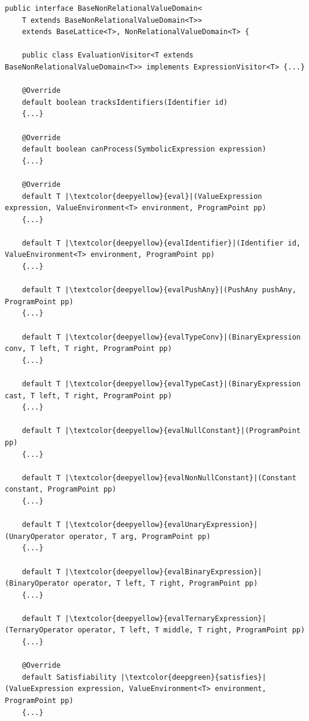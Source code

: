 
\begin{lstlisting}[belowskip=-1.1 \baselineskip, escapechar=|]
public interface BaseNonRelationalValueDomain<
    T extends BaseNonRelationalValueDomain<T>>
    extends BaseLattice<T>, NonRelationalValueDomain<T> {
    
    public class EvaluationVisitor<T extends BaseNonRelationalValueDomain<T>> implements ExpressionVisitor<T> {...}
    
    @Override
    default boolean tracksIdentifiers(Identifier id) 
    {...}
    
    @Override
    default boolean canProcess(SymbolicExpression expression) 
    {...}

    @Override
    default T |\textcolor{deepyellow}{eval}|(ValueExpression expression, ValueEnvironment<T> environment, ProgramPoint pp) 
    {...}
    
    default T |\textcolor{deepyellow}{evalIdentifier}|(Identifier id, ValueEnvironment<T> environment, ProgramPoint pp)
    {...}
    
    default T |\textcolor{deepyellow}{evalPushAny}|(PushAny pushAny, ProgramPoint pp)
    {...}
    
    default T |\textcolor{deepyellow}{evalTypeConv}|(BinaryExpression conv, T left, T right, ProgramPoint pp) 
    {...}
    
    default T |\textcolor{deepyellow}{evalTypeCast}|(BinaryExpression cast, T left, T right, ProgramPoint pp)
    {...}
    
    default T |\textcolor{deepyellow}{evalNullConstant}|(ProgramPoint pp) 
    {...}
    
    default T |\textcolor{deepyellow}{evalNonNullConstant}|(Constant constant, ProgramPoint pp)
    {...}
    
    default T |\textcolor{deepyellow}{evalUnaryExpression}|(UnaryOperator operator, T arg, ProgramPoint pp)
    {...}
    
    default T |\textcolor{deepyellow}{evalBinaryExpression}|(BinaryOperator operator, T left, T right, ProgramPoint pp)
    {...}
    
    default T |\textcolor{deepyellow}{evalTernaryExpression}|(TernaryOperator operator, T left, T middle, T right, ProgramPoint pp)
    {...}

    @Override
    default Satisfiability |\textcolor{deepgreen}{satisfies}|(ValueExpression expression, ValueEnvironment<T> environment, ProgramPoint pp)
    {...}
    

\end{lstlisting}

